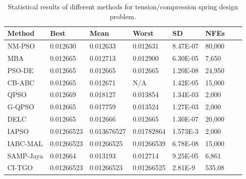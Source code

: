 
\begin{table*}[tp]
    \tiny
\begin{center}

\begin{tabular}{ P{2.0cm} P{2.0cm} P{2.0cm} P{2.0cm} P{2.0cm} P{2.0cm} P{2.0cm} P{2.0cm}  }
\hline
\textbf{Method} & \textbf{Best} & \textbf{Mean} & \textbf{Worst} & \textbf{SD} & \textbf{NFEs} \\
\hline

NM-PSO & 0.012630 & 0.012633 & 0.012631 & 8.47E-07 & 80,000 \\
MBA & 0.012665 & 0.012713 & 0.012900 & 6.30E-05 & 7,650 \\
PSO-DE & 0.012665 & 0.012665 & 0.012665 & 1.20E-08 & 24,950 \\
CB-ABC & 0.012665 & 0.012671 & N/A & 1.42E-05 & 15,000 \\
QPSO & 0.012669 & 0.018127 & 0.013854 & 1.34E-03 & 2,000 \\
G-QPSO & 0.012665 & 0.017759 & 0.013524 & 1.27E-03 & 2,000 \\
DELC & 0.012665 & 0.012666 & 0.012665 & 1.30E-07 & 20,000 \\
IAPSO & 0.01266523 & 0.013676527 & 0.01782864 & 1.573E-3 & 2,000 \\
IABC-MAL & 0.01266523 & 0.01266525 & 0.01266539 & 6.78E-08 & 15,000 \\
SAMP-Jaya & 0.012664 & 0.013193 & 0.012714 & 9.25E-05 & 6,861 \\
CI-TGO & 0.01266523 & 0.01266523 & 0.01266525 & 2.81E-9 & 535.08 \\

\hline
\end{tabular}
\end{center}

\caption{ Statistical results of different methods for tension/compression spring design problem. \\[1em]}
\label{tab:TC}
\end{table*}

